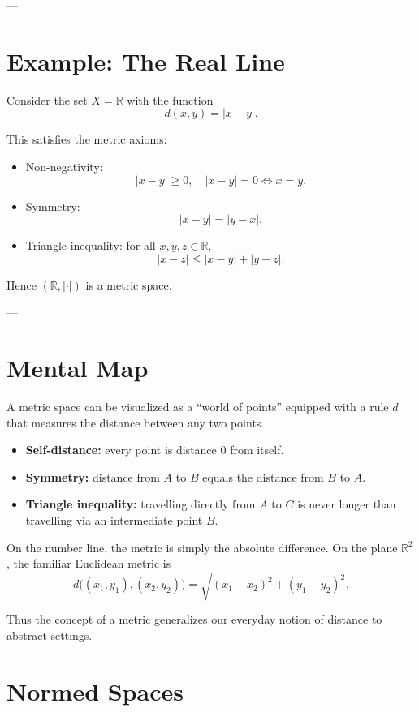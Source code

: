 \documentclass[11pt,a4paper]{article}
\theoremstyle{definition}
\theoremstyle{remark}
\begin{document}
	---
	
	\section*{Example: The Real Line}
	
	Consider the set $X=\mathbb{R}$ with the function
	$$
	d(x,y) = |x-y|.
	$$
	
	This satisfies the metric axioms:
	\begin{itemize}
		\item Non-negativity: $$|x-y|\geq 0, \quad |x-y|=0 \iff x=y.$$
		\item Symmetry: $$|x-y|=|y-x|.$$
		\item Triangle inequality: for all $x,y,z \in \mathbb{R}$,
		$$
		|x-z| \leq |x-y| + |y-z|.
		$$
	\end{itemize}
	
	Hence $(\mathbb{R},|\cdot|)$ is a metric space.
	
	---
	
	\section*{Mental Map}
	
	A metric space can be visualized as a ``world of points'' equipped with a rule $d$ that measures the distance between any two points.
	
	\begin{itemize}
		\item \textbf{Self-distance:} every point is distance $0$ from itself.
		\item \textbf{Symmetry:} distance from $A$ to $B$ equals the distance from $B$ to $A$.
		\item \textbf{Triangle inequality:} travelling directly from $A$ to $C$ is never longer than travelling via an intermediate point $B$.
	\end{itemize}
	
	On the number line, the metric is simply the absolute difference.  
	On the plane $\mathbb{R}^2$, the familiar Euclidean metric is
	$$
	d\big((x_1,y_1),(x_2,y_2)\big) = \sqrt{(x_1-x_2)^2+(y_1-y_2)^2}.
	$$
	
	Thus the concept of a metric generalizes our everyday notion of distance to abstract settings.
	
	\section*{Normed Spaces}
	
\end{document}
